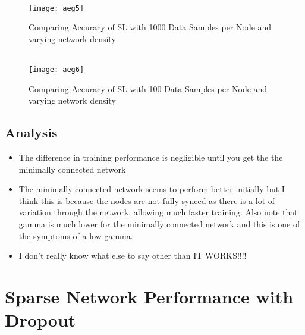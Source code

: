 \begin{figure}[H]
	 \\
	\texttt{[image: aeg5]}
	\caption{Comparing Accuracy of SL with 1000 Data Samples per Node and varying network density}
	\label{aeg5}
\end{figure}

\begin{figure}[H]
	 \\
	\texttt{[image: aeg6]}
	\caption{Comparing Accuracy of SL with 100 Data Samples per Node and varying network density}
	\label{aeg6}
\end{figure}

\subsection{Analysis}

\begin{itemize}
	\item The difference in training performance is negligible until you get the the minimally connected network
	\item The minimally connected network seems to perform better initially but I think this is because the nodes are not fully synced as there is a lot of variation through the network, allowing much faster training. Also note that gamma is much lower for the minimally connected network and this is one of the symptoms of a low gamma.
	\item I don't really know what else to say other than IT WORKS!!!!
\end{itemize}

\section{Sparse Network Performance with Dropout}
